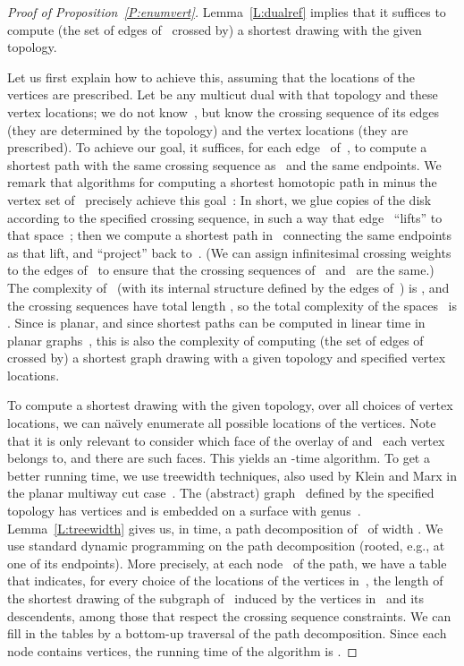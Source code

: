 \documentclass[11pt]{article}
\theoremstyle{plain}  \newtheorem{theorem}{Theorem}[section]
\theoremstyle{definition}
\begin{document}
\begin{proof}[Proof of Proposition~\ref{P:enumvert}]
  Lemma~\ref{L:dualref} implies that it suffices to compute (the set of
  edges of~ crossed by) a shortest drawing with the given topology.  

  Let us first explain how to achieve this, assuming that the locations of
  the vertices are prescribed.  Let  be any multicut dual with that
  topology and these vertex locations; we do not know~, but know the
  crossing sequence of its edges (they are determined by the topology) and
  the vertex locations (they are prescribed).  To achieve our goal, it
  suffices, for each edge~ of~, to compute a shortest path with the
  same crossing sequence as~ and the same endpoints.  We remark that
  algorithms for computing a shortest homotopic path in  minus the
  vertex set of~ precisely achieve this goal~\cite{ce-tnpcs-10}: In
  short, we glue copies of the disk~ according to the specified crossing
  sequence, in such a way that edge~ ``lifts'' to that space~;
  then we compute a shortest path in~ connecting the same
  endpoints as that lift, and ``project'' back to~.  (We can assign
  infinitesimal crossing weights to the edges of~ to ensure that the
  crossing sequences of~ and~ are the same.)  The complexity of~
  (with its internal structure defined by the edges of~) is ,
  and the crossing sequences have total length , so the total
  complexity of the spaces~ is .  Since 
  is planar, and since shortest paths can be computed in linear time in
  planar graphs~\cite{hkrs-fspap-97}, this is also the complexity of
  computing (the set of edges of~ crossed by) a shortest graph drawing
  with a given topology and specified vertex locations.

  To compute a shortest drawing with the given topology, over all choices
  of vertex locations, we can na\"\i{}vely enumerate all possible locations
  of the  vertices.  Note that it is only relevant to consider
  which face of the overlay of  and~ each vertex belongs to, and
  there are  such faces.  This yields an
  -time algorithm.  To get a better running time,
  we use treewidth techniques, also used by Klein and Marx in the planar
  multiway cut case~\cite{km-spktc-12}.  The (abstract) graph~ defined
  by the specified topology has  vertices and is embedded on a
  surface with genus~.  Lemma~\ref{L:treewidth} gives us, in
   time, a path decomposition of~ of width
  .  We use standard dynamic programming on the
  path decomposition (rooted, e.g., at one of its endpoints).  More
  precisely, at each node~ of the path, we have a table that indicates,
  for every choice of the locations of the vertices in~, the length of
  the shortest drawing of the subgraph of~ induced by the vertices
  in~ and its descendents, among those that respect the crossing
  sequence constraints.  We can fill in the tables by a bottom-up traversal
  of the path decomposition.  Since each node contains
   vertices, the running time of the algorithm is
  .
\end{proof}
\end{document}
